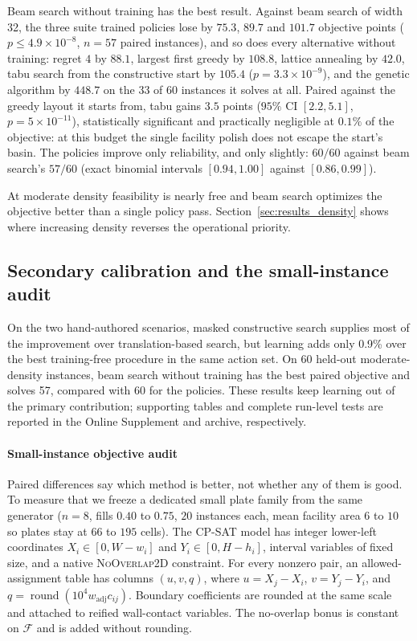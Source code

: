 \documentclass[preprint,12pt,authoryear]{elsarticle}
\newcommand{\cF}{\mathcal{F}}
\begin{document}
Beam search without training has the best result. Against beam search of width 32,
the three suite trained policies lose by $75.3$, $89.7$ and $101.7$ objective
points ($p\le4.9\times10^{-8}$, $n=57$ paired instances), and so does every
alternative without training: regret $4$ by $88.1$, largest first greedy by $108.8$,
lattice annealing by $42.0$, tabu search from the constructive start by $105.4$
($p=3.3\times10^{-9}$), and the genetic algorithm by $448.7$ on the $33$ of $60$
instances it solves at all. Paired against the greedy layout it starts from,
tabu gains $3.5$ points ($95\%$ CI $[2.2,5.1]$, $p=5\times10^{-11}$),
statistically significant and practically negligible at $0.1\%$ of the
objective: at this budget the single facility polish does not escape the
start's basin. The policies improve only reliability, and only slightly:
$60/60$ against beam search's $57/60$
(exact binomial intervals $[0.94,1.00]$ against $[0.86,0.99]$).

At moderate density feasibility is nearly free and beam search optimizes the
objective better than a single policy pass. Section~\ref{sec:results_density}
shows where increasing density reverses the operational priority.

\fi

\subsection{Secondary calibration and the small-instance audit}
\label{sec:results_bench}
On the two hand-authored scenarios, masked constructive search supplies most of
the improvement over translation-based search, but learning adds only 0.9\%
over the best training-free procedure in the same action set. On 60 held-out
moderate-density instances, beam search without training has the best paired
objective and solves 57, compared with 60 for the policies. These results keep
learning out of the primary contribution; supporting tables and complete
run-level tests are reported in the Online Supplement and archive, respectively.

\paragraph{Small-instance objective audit}
Paired differences say which method is better, not whether any of them is good.
To measure that we freeze a dedicated small plate family from the same
generator ($n=8$, fills $0.40$ to $0.75$, $20$ instances each, mean facility
area $6$ to $10$ so plates stay at $66$ to $195$ cells). The CP-SAT model
\citep{GoogleCPSAT} has
integer lower-left coordinates $X_i\in[0,W-w_i]$ and
$Y_i\in[0,H-h_i]$, interval variables of fixed size, and a native
\textsc{NoOverlap2D} constraint. For every nonzero pair, an allowed-assignment
table has columns $(u,v,q)$, where $u=X_j-X_i$, $v=Y_j-Y_i$, and
$q=\operatorname{round}(10^4 w_{\mathrm{adj}}c_{ij})$. Boundary coefficients are rounded at the
same scale and attached to reified wall-contact variables. The no-overlap bonus
is constant on $\cF$ and is added without rounding.
\end{document}
